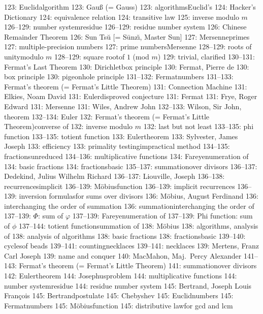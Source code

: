 123: Euclid\sub algorithm
123: Gau{\ss} (= Gauss)
123: algorithms\sub Euclid's
124: Hacker's Dictionary
124: equivalence relation
124: transitive law
125: inverse modulo $m$
126--129: number system\sub residue
126--129: residue number system
126: Chinese Remainder Theorem
126: Sun Ts\u u [= S\=unz\u{\i}, Master Sun]
127: Mersenne\sub primes
127: multiple-precision numbers
127: prime numbers\sub Mersenne
128--129: roots of unity\sub modulo $m$
128--129: square root\sub of $1$ (mod $m$)
129: trivial, clarified
130--131: Fermat's Last Theorem
130: Dirichlet\sub box principle
130: Fermat, Pierre de
130: box principle
130: pigeonhole principle
131--132: Fermat\sub numbers
131--133: Fermat's theorem (= Fermat's Little Theorem)
131: Connection Machine
131: Elkies, Noam David
131: Euler\sub disproved conjecture
131: Fermat
131: Frye, Roger Edward
131: Mersenne
131: Wiles, Andrew John
132--133: Wilson, Sir John, theorem
132--134: Euler
132: Fermat's theorem (= Fermat's Little Theorem)\sub converse of
132: inverse modulo $m$
132: last but not least
133--135: phi function
133--135: totient function
133: Euler\sub theorem
133: Sylvester, James Joseph
133: efficiency
133: primality testing\sub impractical method
134--135: fractions\sub unreduced
134--136: multiplicative functions
134: Farey\sub enumeration of
134: basic fractions
134: fractions\sub basic
135--137: summation\sub over divisors
136--137: Dedekind, Julius Wilhelm Richard
136--137: Liouville, Joseph
136--138: recurrences\sub implicit
136--139: M\"obius\sub function
136--139: implicit recurrences
136--139: inversion formulas\sub for sums over divisors
136: M\"obius, August Ferdinand
136: interchanging the order of summation
136: summation\sub interchanging the order of
137--139: $\Phi$: sum of $\varphi$
137--139: Farey\sub enumeration of
137--139: Phi function: sum of $\phi$
137--144: totient function\sub summation of
138: M\"obius
138: algorithms, analysis of
138: analysis of algorithms
138: basic fractions
138: fractions\sub basic
139--140: cycles\sub of beads
139--141: counting\sub necklaces
139--141: necklaces
139: Mertens, Franz Carl Joseph
139: name and conquer
140: MacMahon, Maj.~Percy Alexander
141--143: Fermat's theorem (= Fermat's Little Theorem)
141: summation\sub over divisors
142: Euler\sub theorem
144: Josephus\sub problem
144: multiplicative functions
144: number system\sub residue
144: residue number system
145: Bertrand, Joseph Louis Fran\c{c}ois
145: Bertrand\sub postulate
145: Chebyshev
145: Euclid\sub numbers
145: Fermat\sub numbers
145: M\"obius\sub function
145: distributive law\sub for gcd and lcm
